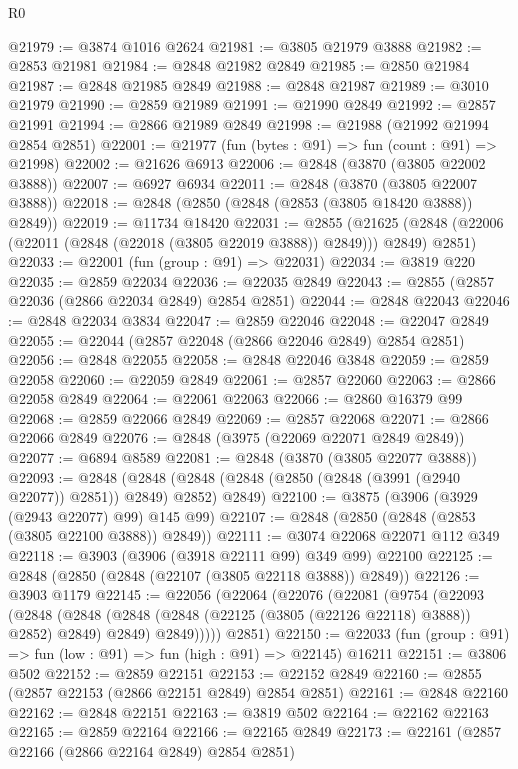 \begin{lexlean}{R0}
\begin{coremodule}
@21979 := @3874 @1016 @2624
@21981 := @3805 @21979 @3888
@21982 := @2853 @21981
@21984 := @2848 @21982 @2849
@21985 := @2850 @21984
@21987 := @2848 @21985 @2849
@21988 := @2848 @21987
@21989 := @3010 @21979
@21990 := @2859 @21989
@21991 := @21990 @2849
@21992 := @2857 @21991
@21994 := @2866 @21989 @2849
@21998 := @21988 (@21992 @21994 @2854 @2851)
@22001 := @21977 (fun (bytes : @91) => fun (count : @91) => @21998)
@22002 := @21626 @6913
@22006 := @2848 (@3870 (@3805 @22002 @3888))
@22007 := @6927 @6934
@22011 := @2848 (@3870 (@3805 @22007 @3888))
@22018 := @2848 (@2850 (@2848 (@2853 (@3805 @18420 @3888)) @2849))
@22019 := @11734 @18420
@22031 := @2855
    (@21625 (@2848 (@22006 (@22011 (@2848 (@22018 (@3805 @22019 @3888)) @2849))) @2849) @2851)
@22033 := @22001 (fun (group : @91) => @22031)
@22034 := @3819 @220
@22035 := @2859 @22034
@22036 := @22035 @2849
@22043 := @2855 (@2857 @22036 (@2866 @22034 @2849) @2854 @2851)
@22044 := @2848 @22043
@22046 := @2848 @22034 @3834
@22047 := @2859 @22046
@22048 := @22047 @2849
@22055 := @22044 (@2857 @22048 (@2866 @22046 @2849) @2854 @2851)
@22056 := @2848 @22055
@22058 := @2848 @22046 @3848
@22059 := @2859 @22058
@22060 := @22059 @2849
@22061 := @2857 @22060
@22063 := @2866 @22058 @2849
@22064 := @22061 @22063
@22066 := @2860 @16379 @99
@22068 := @2859 @22066 @2849
@22069 := @2857 @22068
@22071 := @2866 @22066 @2849
@22076 := @2848 (@3975 (@22069 @22071 @2849 @2849))
@22077 := @6894 @8589
@22081 := @2848 (@3870 (@3805 @22077 @3888))
@22093 := @2848
    (@2848 (@2848 (@2848 (@2850 (@2848 (@3991 (@2940 @22077)) @2851)) @2849) @2852) @2849)
@22100 := @3875 (@3906 (@3929 (@2943 @22077) @99) @145 @99)
@22107 := @2848 (@2850 (@2848 (@2853 (@3805 @22100 @3888)) @2849))
@22111 := @3074 @22068 @22071 @112 @349
@22118 := @3903 (@3906 (@3918 @22111 @99) @349 @99) @22100
@22125 := @2848 (@2850 (@2848 (@22107 (@3805 @22118 @3888)) @2849))
@22126 := @3903 @1179
@22145 := @22056
    (@22064
      (@22076
        (@22081
          (@9754
            (@22093
              (@2848
                (@2848 (@2848 (@2848 (@22125 (@3805 (@22126 @22118) @3888)) @2852) @2849) @2849)
                @2849)))))
      @2851)
@22150 := @22033 (fun (group : @91) => fun (low : @91) => fun (high : @91) => @22145) @16211
@22151 := @3806 @502
@22152 := @2859 @22151
@22153 := @22152 @2849
@22160 := @2855 (@2857 @22153 (@2866 @22151 @2849) @2854 @2851)
@22161 := @2848 @22160
@22162 := @2848 @22151
@22163 := @3819 @502
@22164 := @22162 @22163
@22165 := @2859 @22164
@22166 := @22165 @2849
@22173 := @22161 (@2857 @22166 (@2866 @22164 @2849) @2854 @2851)

\end{coremodule}
\end{lexlean}
